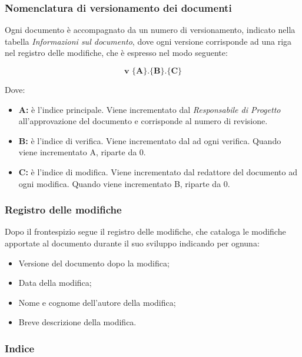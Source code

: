 \documentclass[../NormediProgetto.tex]{subfiles}
\begin{document}
\subsubsection{Nomenclatura di versionamento dei documenti}
Ogni documento è accompagnato da un numero di versionamento, indicato nella tabella \textit{Informazioni sul documento}, dove ogni versione corrisponde ad una riga nel registro delle modifiche, che è espresso nel modo seguente:

\[\textbf{v $\biggl\{$A$\biggr\}$.$\biggl\{$B$\biggr\}$.$\biggl\{$C$\biggr\}$}\]

Dove:

\begin{itemize}
    \item{\textbf{A:}} è l'indice principale. Viene incrementato dal \textit{Responsabile di Progetto} all’approvazione del documento e 
    corrisponde al numero di revisione.
    \item{\textbf{B:}} è l'indice di verifica. Viene incrementato dal  ad ogni verifica. Quando viene incrementato A, riparte da 0.
    \item{\textbf{C:}} è l'indice di modifica. Viene incrementato dal redattore del documento ad ogni modifica. Quando viene incrementato B, riparte da 0.
\end{itemize}

\subsubsection{Registro delle modifiche}

Dopo il frontespizio segue il registro delle modifiche, che cataloga le modifiche apportate al documento durante il suo sviluppo indicando per ognuna:

\begin{itemize}
    \item Versione del documento dopo la modifica;
    \item Data della modifica;
    \item Nome e cognome dell'autore della modifica;
    \item Breve descrizione della modifica.
\end{itemize}

\subsubsection{Indice}
\end{document}
